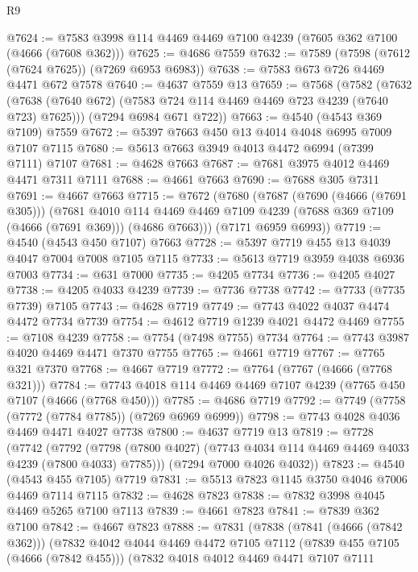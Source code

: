 \begin{lexlean}{R9}
\begin{coremodule}
@7624 := @7583 @3998 @114 @4469 @4469 @7100 @4239 (@7605 @362 @7100 (@4666 (@7608 @362)))
@7625 := @4686 @7559
@7632 := @7589 (@7598 (@7612 (@7624 @7625)) (@7269 @6953 @6983))
@7638 := @7583 @673 @726 @4469 @4471 @672 @7578
@7640 := @4637 @7559 @13
@7659 := @7568
    (@7582
      (@7632 (@7638 (@7640 @672) (@7583 @724 @114 @4469 @4469 @723 @4239 (@7640 @723) @7625)))
      (@7294 @6984 @671 @722))
@7663 := @4540 (@4543 @369 @7109) @7559
@7672 := @5397 @7663 @450 @13 @4014 @4048 @6995 @7009 @7107 @7115
@7680 := @5613 @7663 @3949 @4013 @4472 @6994 (@7399 @7111) @7107
@7681 := @4628 @7663
@7687 := @7681 @3975 @4012 @4469 @4471 @7311 @7111
@7688 := @4661 @7663
@7690 := @7688 @305 @7311
@7691 := @4667 @7663
@7715 := @7672
    (@7680
      (@7687
        (@7690 (@4666 (@7691 @305)))
        (@7681
          @4010
          @114
          @4469
          @4469
          @7109
          @4239
          (@7688 @369 @7109 (@4666 (@7691 @369)))
          (@4686 @7663)))
      (@7171 @6959 @6993))
@7719 := @4540 (@4543 @450 @7107) @7663
@7728 := @5397 @7719 @455 @13 @4039 @4047 @7004 @7008 @7105 @7115
@7733 := @5613 @7719 @3959 @4038 @6936 @7003
@7734 := @631 @7000
@7735 := @4205 @7734
@7736 := @4205 @4027
@7738 := @4205 @4033 @4239
@7739 := @7736 @7738
@7742 := @7733 (@7735 @7739) @7105
@7743 := @4628 @7719
@7749 := @7743 @4022 @4037 @4474 @4472 @7734 @7739
@7754 := @4612 @7719 @1239 @4021 @4472 @4469
@7755 := @7108 @4239
@7758 := @7754 (@7498 @7755) @7734
@7764 := @7743 @3987 @4020 @4469 @4471 @7370 @7755
@7765 := @4661 @7719
@7767 := @7765 @321 @7370
@7768 := @4667 @7719
@7772 := @7764 (@7767 (@4666 (@7768 @321)))
@7784 := @7743 @4018 @114 @4469 @4469 @7107 @4239 (@7765 @450 @7107 (@4666 (@7768 @450)))
@7785 := @4686 @7719
@7792 := @7749 (@7758 (@7772 (@7784 @7785)) (@7269 @6969 @6999))
@7798 := @7743 @4028 @4036 @4469 @4471 @4027 @7738
@7800 := @4637 @7719 @13
@7819 := @7728
    (@7742
      (@7792 (@7798 (@7800 @4027) (@7743 @4034 @114 @4469 @4469 @4033 @4239 (@7800 @4033) @7785)))
      (@7294 @7000 @4026 @4032))
@7823 := @4540 (@4543 @455 @7105) @7719
@7831 := @5513 @7823 @1145 @3750 @4046 @7006 @4469 @7114 @7115
@7832 := @4628 @7823
@7838 := @7832 @3998 @4045 @4469 @5265 @7100 @7113
@7839 := @4661 @7823
@7841 := @7839 @362 @7100
@7842 := @4667 @7823
@7888 := @7831
    (@7838
      (@7841 (@4666 (@7842 @362)))
      (@7832
        @4042
        @4044
        @4469
        @4472
        @7105
        @7112
        (@7839 @455 @7105 (@4666 (@7842 @455)))
        (@7832
          @4018
          @4012
          @4469
          @4471
          @7107
          @7111

\end{coremodule}
\end{lexlean}
